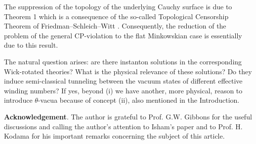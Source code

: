 \documentclass[a4paper,12pt,draft]{article}
\begin{document}
The suppression of the topology of the underlying Cauchy surface is due to
Theorem 1 which is a consequence of the so-called Topological Censorship
Theorem of Friedman--Schleich--Witt \cite{fri-sch}. Consequently, the
reduction of the problem of the general CP-violation to the flat
Minkowskian case is essentially due to this result.  

The natural question arises: are there instanton solutions in the
corresponding Wick-rotated theories? What is the physical relevance of
these solutions? Do they induce semi-classical tunneling between the
vacuum states of different effective winding numbers? If yes, beyond (i)
we have another, more physical, reason to introduce $\theta$-vacua because
of concept (ii), also mentioned in the Introduction.

{\bf Acknowledgement}. The author is grateful to Prof. G.W. Gibbons for
the useful discussions and calling the author's attention to Isham's paper
and to Prof. H. Kodama for his important remarks concerning the subject
of this article.
\end{document}
